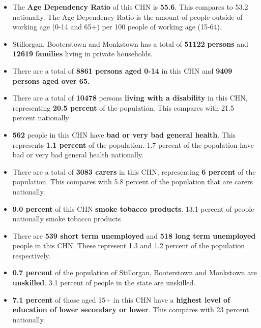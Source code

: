\documentclass{article}
\begin{document}
\begin{itemize}

\item The \textbf{Age Dependency Ratio} of this CHN is  \textbf{55.6}. This compares to 53.2 nationally. The Age Dependency Ratio is the amount of people outside of working age (0-14 and 65+) per 100 people of working age (15-64). 

\item Stillorgan, Booterstown and Monkstown has a total of \textbf{\num{51122}} \textbf{persons} and  \textbf{\num{12619}} \textbf{families} living in private households.

\item There are a total of \textbf{\num{8861} persons aged 0-14} in this CHN and \textbf{\num{9409} persons aged over 65.} 

\item There are a total of \textbf{\num{10478}} persons \textbf{living with a disability} in this CHN, representing \textbf{20.5 percent} of the population. This compares with  21.5 percent nationally

\item \textbf{\num{562}} people in this CHN have \textbf{bad or very bad general health}. This represents \textbf{1.1 percent} of the population. 1.7 percent of the population have bad or very bad general health nationally. 

\item There are a total of \textbf{\num{3083} carers} in this CHN, representing \textbf{6 percent} of the population. This compares with 5.8 percent of the population that are carers nationally. 

\item \textbf{9.0 percent} of this CHN \textbf{smoke tobacco products}. 13.1 percent of people nationally smoke tobacco products

\item There are \textbf{\num{539} short term unemployed} and \textbf{\num{518} long term unemployed} people in this CHN. These represent 1.3 and 1.2 percent of the population respectively.

\item  \textbf{0.7 percent} of the population of Stillorgan, Booterstown and Monkstown are \textbf{unskilled}. 3.1 percent of people in the state are unskilled.

\item \textbf{7.1 percent} of those aged 15+ in this CHN have a \textbf{highest level of education of lower secondary or lower}. This compares with 23 percent nationally. 


\end{itemize}
\end{document}

